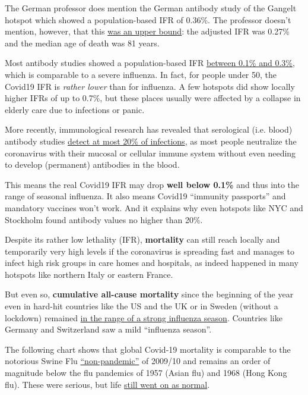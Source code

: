 The German professor does mention the German antibody study of the
Gangelt hotspot which showed a population-based IFR of 0.36\%. The
professor doesn't mention, however, that this
\href{https://swprs.org/studies-on-covid-19-lethality/}{was an upper
bound}: the adjusted IFR was 0.27\% and the median age of death was 81
years.

Most antibody studies showed a population-based IFR
\href{https://swprs.org/studies-on-covid-19-lethality/}{between 0.1\%
and 0.3\%}, which is comparable to a severe influenza. In fact, for
people under 50, the Covid19 IFR is \emph{rather lower} than for
influenza. A few hotspots did show locally higher IFRs of up to 0.7\%,
but these places usually were affected by a collapse in elderly care due
to infections or panic.

More recently, immunological research has revealed that serological
(i.e. blood) antibody studies
\href{https://swprs.org/coronavirus-antibody-tests-show-only-one-fifth-of-infections/}{detect
at most 20\% of infections}, as most people neutralize the coronavirus
with their mucosal or cellular immune system without even needing to
develop (permanent) antibodies in the blood.

This means the real Covid19 IFR may drop \textbf{well below 0.1\%} and
thus into the range of seasonal influenza. It also means Covid19
``immunity passports'' and mandatory vaccines won't work. And it
explains why even hotspots like NYC and Stockholm found antibody values
no higher than 20\%.

Despite its rather low lethality (IFR), \textbf{mortality} can still
reach locally and temporarily very high levels if the coronavirus is
spreading fast and manages to infect high risk groups in care homes and
hospitals, as indeed happened in many hotspots like northern Italy or
eastern France.

But even so, \textbf{cumulative all-cause mortality} since the beginning
of the year even in hard-hit countries like the US and the UK or in
Sweden (without a lockdown) remained
\href{https://swprs.org/studies-on-covid-19-lethality/\#overall-mortality}{in
the range of a strong influenza season}. Countries like Germany and
Switzerland saw a mild ``influenza season''.

The following chart shows that global Covid-19 mortality is comparable
to the notorious Swine Flu
\href{https://www.forbes.com/2010/02/05/world-health-organization-swine-flu-pandemic-opinions-contributors-michael-fumento.html}{``non-pandemic''}
of 2009/10 and remains an order of magnitude below the flu pandemics of
1957 (Asian flu) and 1968 (Hong Kong flu). These were serious, but life
\href{https://nypost.com/2020/05/16/why-life-went-on-as-normal-during-the-killer-pandemic-of-1969/}{still
went on as normal}.

